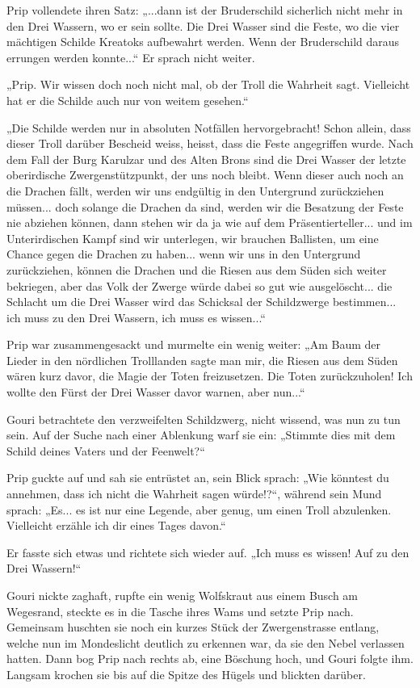 \documentclass[10pt, a4paper, oneside]{book}
\begin{document}
Prip vollendete ihren Satz: „...dann ist der Bruderschild sicherlich nicht mehr in den Drei Wassern, wo er sein sollte. Die Drei Wasser sind die Feste, wo die vier mächtigen Schilde Kreatoks aufbewahrt werden. Wenn der Bruderschild daraus errungen werden konnte...“ Er sprach nicht weiter.

„Prip. Wir wissen doch noch nicht mal, ob der Troll die Wahrheit sagt. Vielleicht hat er die Schilde auch nur von weitem gesehen.“

„Die Schilde werden nur in absoluten Notfällen hervorgebracht! Schon allein, dass dieser Troll darüber Bescheid weiss, heisst, dass die Feste angegriffen wurde. Nach dem Fall der Burg Karulzar und des Alten Brons sind die Drei Wasser der letzte oberirdische Zwergenstützpunkt, der uns noch bleibt. Wenn dieser auch noch an die Drachen fällt, werden wir uns endgültig in den Untergrund zurückziehen müssen... doch solange die Drachen da sind, werden wir die Besatzung der Feste nie abziehen können, dann stehen wir da ja wie auf dem Präsentierteller... und im Unterirdischen Kampf sind wir unterlegen, wir brauchen Ballisten, um eine Chance gegen die Drachen zu haben... wenn wir uns in den Untergrund zurückziehen, können die Drachen und die Riesen aus dem Süden sich weiter bekriegen, aber das Volk der Zwerge würde dabei so gut wie ausgelöscht... die Schlacht um die Drei Wasser wird das Schicksal der Schildzwerge bestimmen... ich muss zu den Drei Wassern, ich muss es wissen...“

Prip war zusammengesackt und murmelte ein wenig weiter: „Am Baum der Lieder in den nördlichen Trolllanden sagte man mir, die Riesen aus dem Süden wären kurz davor, die Magie der Toten freizusetzen. Die Toten zurückzuholen! Ich wollte den Fürst der Drei Wasser davor warnen, aber nun...“

Gouri betrachtete den verzweifelten Schildzwerg, nicht wissend, was nun zu tun sein. Auf der Suche nach einer Ablenkung warf sie ein: „Stimmte dies mit dem Schild deines Vaters und der Feenwelt?“

Prip guckte auf und sah sie entrüstet an, sein Blick sprach: „Wie könntest du annehmen, dass ich nicht die Wahrheit sagen würde!?“, während sein Mund sprach: „Es... es ist nur eine Legende, aber genug, um einen Troll abzulenken. Vielleicht erzähle ich dir eines Tages davon.“

Er fasste sich etwas und richtete sich wieder auf. „Ich muss es wissen! Auf zu den Drei Wassern!“

Gouri nickte zaghaft, rupfte ein wenig Wolfskraut aus einem Busch am Wegesrand, steckte es in die Tasche ihres Wams und setzte Prip nach. Gemeinsam huschten sie noch ein kurzes Stück der Zwergenstrasse entlang, welche nun im Mondeslicht deutlich zu erkennen war, da sie den Nebel verlassen hatten. Dann bog Prip nach rechts ab, eine Böschung hoch, und Gouri folgte ihm. Langsam krochen sie bis auf die Spitze des Hügels und blickten darüber.
\end{document}
